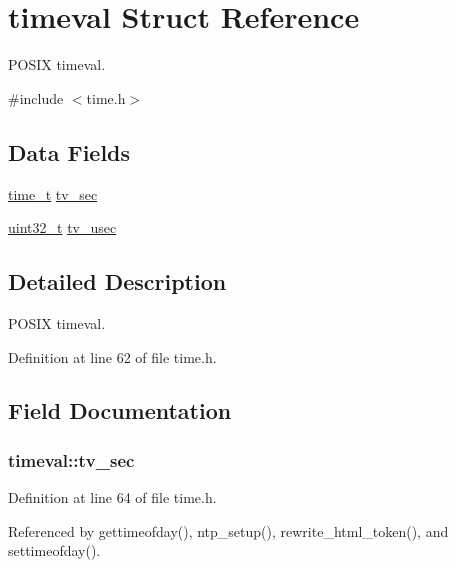 \hypertarget{structtimeval}{\section{timeval Struct Reference}
\label{structtimeval}
}


P\-O\-S\-I\-X timeval.  




{\ttfamily \#include $<$time.\-h$>$}

\subsection*{Data Fields}
\begin{DoxyCompactItemize}
\item 
\hyperlink{time_8h_a3346b04b0420b32ccf6b706551b70762}{time\-\_\-t} \hyperlink{structtimeval_aef6ddab1064c430758f9f913b7e4a21e}{tv\-\_\-sec}
\item 
\hyperlink{send_8c_a435d1572bf3f880d55459d9805097f62}{uint32\-\_\-t} \hyperlink{structtimeval_a8fd7abf5420981b3ff58bb23df458587}{tv\-\_\-usec}
\end{DoxyCompactItemize}


\subsection{Detailed Description}
P\-O\-S\-I\-X timeval. 

Definition at line 62 of file time.\-h.



\subsection{Field Documentation}
\hypertarget{structtimeval_aef6ddab1064c430758f9f913b7e4a21e}{
\subsubsection[{tv\-\_\-sec}]{ timeval\-::tv\-\_\-sec}}\label{structtimeval_aef6ddab1064c430758f9f913b7e4a21e}


Definition at line 64 of file time.\-h.



Referenced by gettimeofday(), ntp\-\_\-setup(), rewrite\-\_\-html\-\_\-token(), and settimeofday().

